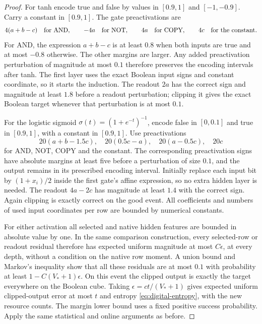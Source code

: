 \begin{proof}
For tanh encode true and false by values in $[0.9,1]$ and $[-1,-0.9]$. Carry a constant in $[0.9,1]$. The gate preactivations are
\[
 4(a+b-c)\quad\hbox{for AND},\qquad -4a\quad\hbox{for NOT},
 \qquad4a\quad\hbox{for COPY},\qquad4c\quad\hbox{for the constant}.
\]
For AND, the expression $a+b-c$ is at least $0.8$ when both inputs are true and at most $-0.8$ otherwise. The other margins are larger. Any added preactivation perturbation of magnitude at most $0.1$ therefore preserves the encoding intervals after tanh. The first layer uses the exact Boolean input signs and constant coordinate, so it starts the induction. The readout $2a$ has the correct sign and magnitude at least $1.8$ before a readout perturbation; clipping it gives the exact Boolean target whenever that perturbation is at most $0.1$.

For the logistic sigmoid $\sigma(t)=(1+e^{-t})^{-1}$, encode false in $[0,0.1]$ and true in $[0.9,1]$, with a constant in $[0.9,1]$. Use preactivations
\[
 20(a+b-1.5c),\quad20(0.5c-a),\quad20(a-0.5c),\quad20c
\]
for AND, NOT, COPY and the constant. The corresponding preactivation signs have absolute margins at least five before a perturbation of size $0.1$, and the output remains in its prescribed encoding interval. Initially replace each input bit by $(1+x_i)/2$ inside the first gate's affine expression, so no extra hidden layer is needed. The readout $4a-2c$ has magnitude at least $1.4$ with the correct sign. Again clipping is exactly correct on the good event. All coefficients and numbers of used input coordinates per row are bounded by numerical constants.

For either activation all selected and native hidden features are bounded in absolute value by one. In the same comparison construction, every selected-row or readout residual therefore has expected uniform magnitude at most $C\epsilon$, at every depth, without a condition on the native row moment. A union bound and Markov's inequality show that all these residuals are at most $0.1$ with probability at least $1-C(V_*+1)\epsilon$. On this event the clipped output is exactly the target everywhere on the Boolean cube. Taking $\epsilon=ct/(V_*+1)$ gives expected uniform clipped-output error at most $t$ and entropy \eqref{eq:digital-entropy}, with the new resource counts. The margin lower bound uses a fixed positive success probability. Apply the same statistical and online arguments as before.
\end{proof}
